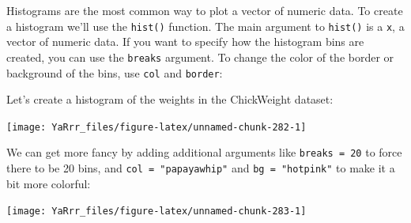 \documentclass[]{book}
\newenvironment{Shaded}{\begin{snugshade}}{\end{snugshade}}
\newcommand{\KeywordTok}[1]{\textcolor[rgb]{0.13,0.29,0.53}{\textbf{#1}}}
\newcommand{\DataTypeTok}[1]{\textcolor[rgb]{0.13,0.29,0.53}{#1}}
\newcommand{\DecValTok}[1]{\textcolor[rgb]{0.00,0.00,0.81}{#1}}
\newcommand{\StringTok}[1]{\textcolor[rgb]{0.31,0.60,0.02}{#1}}
\newcommand{\CommentTok}[1]{\textcolor[rgb]{0.56,0.35,0.01}{\textit{#1}}}
\newcommand{\OperatorTok}[1]{\textcolor[rgb]{0.81,0.36,0.00}{\textbf{#1}}}
\newcommand{\NormalTok}[1]{#1}
\theoremstyle{definition}
\theoremstyle{definition}
\theoremstyle{remark}
\begin{document}
Histograms are the most common way to plot a vector of numeric data. To
create a histogram we'll use the \texttt{hist()} function. The main
argument to \texttt{hist()} is a \texttt{x}, a vector of numeric data.
If you want to specify how the histogram bins are created, you can use
the \texttt{breaks} argument. To change the color of the border or
background of the bins, use \texttt{col} and \texttt{border}:

Let's create a histogram of the weights in the ChickWeight dataset:

\begin{Shaded}
\end{Shaded}

\begin{center}\texttt{[image: YaRrr\_files/figure-latex/unnamed-chunk-282-1]} \end{center}

We can get more fancy by adding additional arguments like
\texttt{breaks\ =\ 20} to force there to be 20 bins, and
\texttt{col\ =\ "papayawhip"} and \texttt{bg\ =\ "hotpink"} to make it a
bit more colorful:

\begin{Shaded}
\end{Shaded}

\begin{center}\texttt{[image: YaRrr\_files/figure-latex/unnamed-chunk-283-1]} \end{center}
\end{document}
